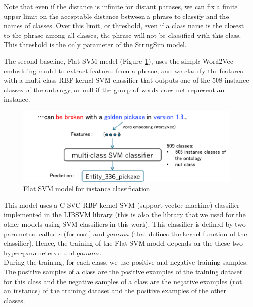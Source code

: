 \documentclass[12pt]{article}
\begin{document}
Note that even if the distance is infinite for distant phrases, we can fix a finite upper limit on the acceptable distance between a phrase to classify and the names of classes. Over this limit, or threshold, even if a class name is the closest to the phrase among all classes, the phrase will not be classified with this class. This threshold is the only parameter of the StringSim model.

The second baseline, Flat SVM model (Figure~\ref{flatSVMModel}), uses the simple Word2Vec embedding model to extract features from a phrase, and we classify the features with a multi-class RBF kernel SVM classifier that outputs one of the 508 instance classes of the ontology, or null if the group of words does not represent an instance.

\begin{figure}[!ht]
   \centering \includegraphics[width=0.7\linewidth]{Figures/Semantic_Parsing/flatSVMModel.png}
   \caption{\label{flatSVMModel} Flat SVM model for instance classification}
\end{figure}

This model uses a C-SVC RBF kernel SVM (support vector machine) classifier implemented in the LIBSVM library \cite{chang2011libsvm} (this is also the library that we used for the other models using SVM classifiers in this work). This classifier is defined by two parameters called $c$ (for cost) and $gamma$ (that defines the kernel function of the classifier). Hence, the training of the Flat SVM model depends on the these two hyper-parameters $c$ and $gamma$.\\
During the training, for each class, we use positive and negative training samples. The positive samples of a class are the positive examples of the training dataset for this class and the negative samples of a class are the negative examples (not an instance) of the training dataset and the positive examples of the other classes.
\end{document}
